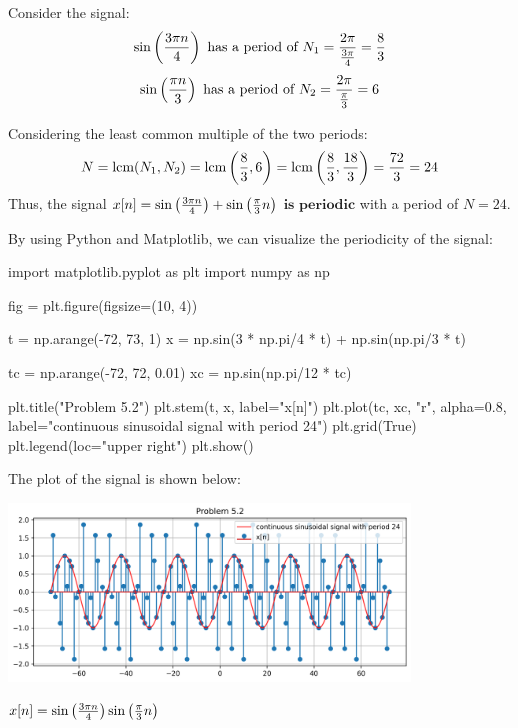\documentclass[a4paper, 10pt]{article}
\begin{document}
\begin{solution}
Consider the signal:
\[
    \sin \left( \frac{3\pi n}{4} \right) \text{ has a period of } N_1 = \frac{2\pi}{\frac{3\pi}{4}} = \frac{8}{3}
\]
\[
    \sin \left( \frac{\pi n}{3} \right) \text{ has a period of } N_2 = \frac{2\pi}{\frac{\pi}{3}} = 6
\]

Considering the least common multiple of the two periods:
\[
    N = \text{lcm}(N_1, N_2) = \text{lcm}\left(\frac{8}{3}, 6\right) = \text{lcm}\left(\frac{8}{3}, \frac{18}{3}\right) = \frac{72}{3} = 24
\]
Thus, the signal \( x[n] = \sin \left( \frac{3\pi n}{4} \right) + \sin\left( \frac{\pi}{3}n \right) \) \( \boxed{\textbf{is periodic}} \) with a period of \( \boxed{N = 24} \).

\vspace{5mm}

By using Python and Matplotlib, we can visualize the periodicity of the signal:
\begin{codingbox}
import matplotlib.pyplot as plt
import numpy as np

fig = plt.figure(figsize=(10, 4))

t = np.arange(-72, 73, 1)
x = np.sin(3 * np.pi/4 * t) + np.sin(np.pi/3 * t)

tc = np.arange(-72, 72, 0.01)
xc = np.sin(np.pi/12 * tc)

plt.title("Problem 5.2")
plt.stem(t, x, label="x[n]")
plt.plot(tc, xc, "r", alpha=0.8, label="continuous sinusoidal signal with period 24")
plt.grid(True)
plt.legend(loc="upper right")
plt.show()
\end{codingbox}

The plot of the signal is shown below:
\begin{center}
    \includegraphics[width=0.8\textwidth]{images/problem_5_2.png}
\end{center}
\end{solution}

\newpage

\begin{subproblems}[start=3]
    \item \( x[n] = \sin \left( \frac{3\pi n}{4} \right)\sin\left( \frac{\pi}{3}n \right) \)
\end{subproblems}
\end{document}
